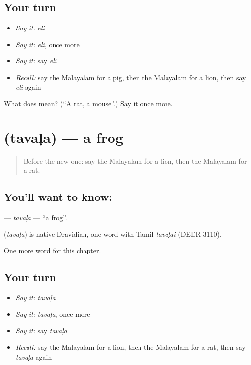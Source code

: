 \subsection*{Your turn}
\begin{itemize}
\raggedright
  \item \emph{Say it:} \emph{eli}
  \item \emph{Say it:} \emph{eli}, once more
  \item \emph{Say it:} say \emph{eli}
  \item \emph{Recall:} say the Malayalam for a pig, then the Malayalam for a lion, then say \emph{eli} again
\end{itemize}

\begin{tcolorbox}[breakable,colback=teal!4,colframe=teal!35!black,title={Before you move on}]
What does  mean? (\textquotedblleft{}A rat, a mouse\textquotedblright{}.) Say it once more.
\end{tcolorbox}
\section[\texorpdfstring{\ml{തവള} (tavaḷa)}{തവള (tavaḷa)}]{ (tavaḷa) — a frog}

\label{lesson:ML-C152-tavala}



\begin{quote}
Before the new one: say the Malayalam for a lion, then the Malayalam for a rat.
\end{quote}

\subsection*{You'll want to know: }
\textbf{} — \emph{tavaḷa} — \textquotedblleft{}a frog\textquotedblright{}.

\begin{cousinweb}
\textbf{} (\emph{tavaḷa}) is native Dravidian, one word with Tamil \emph{tavaḷai} (DEDR 3110).
\end{cousinweb}

\begin{grammarlens}[title={What you've built}]
One more word for this chapter.
\end{grammarlens}

\subsection*{Your turn}
\begin{itemize}
\raggedright
  \item \emph{Say it:} \emph{tavaḷa}
  \item \emph{Say it:} \emph{tavaḷa}, once more
  \item \emph{Say it:} say \emph{tavaḷa}
  \item \emph{Recall:} say the Malayalam for a lion, then the Malayalam for a rat, then say \emph{tavaḷa} again
\end{itemize}

